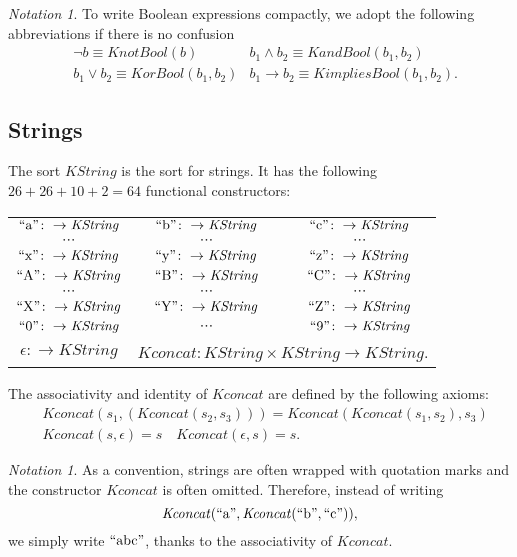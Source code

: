 \documentclass[UTF8]{article}
\newcounter{thmcounter}
\theoremstyle{plain}
\theoremstyle{definition}
\theoremstyle{remark}
\newtheorem{notation}[thmcounter]{Notation}
\newcommand{\KandBool}{\mathit{KandBool}}
\newcommand{\KorBool}{\mathit{KorBool}}
\newcommand{\KnotBool}{\mathit{KnotBool}}
\newcommand{\KimpliesBool}{\mathit{KimpliesBool}}
\newcommand{\KString}{\mathit{KString}}
\newcommand{\Kconcat}{\mathit{Kconcat}}
\newcommand{\quot}[1]{\mathrm{``#1"}}
\begin{document}
\begin{notation}
	To write Boolean expressions compactly, we adopt the following abbreviations if there is no confusion
	\begin{align*}
	&\neg b \equiv \KnotBool(b)
	&b_1 \wedge b_2 \equiv \KandBool(b_1, b_2)
	\\
	&b_1 \vee b_2 \equiv \KorBool(b_1, b_2)
	&b_1 \to b_2 \equiv \KimpliesBool(b_1, b_2).
	\end{align*}
\end{notation}

\subsection{Strings}
The sort $\KString$ is the sort for strings. It has the following $26 + 26 + 10 + 2 = 64$ functional constructors:
\begin{center}
\begin{tabular}{c c c}
	$\quot{a} \colon \to \KString$ & $\quot{b} \colon \to \KString$ & $\quot{c} \colon \to \KString$ \\
	$\cdots$ & $\cdots$ & $\cdots$ \\
	$\quot{x} \colon \to \KString$ & $\quot{y} \colon \to \KString$ & $\quot{z} \colon \to \KString$ \\
	$\quot{A} \colon \to \KString$ & $\quot{B} \colon \to \KString$ & $\quot{C} \colon \to \KString$ \\
    $\cdots$ & $\cdots$ & $\cdots$ \\
    $\quot{X} \colon \to \KString$ & $\quot{Y} \colon \to \KString$ & $\quot{Z} \colon \to \KString$ \\
    $\quot{0} \colon \to \KString$ & $\cdots$ & $\quot{9} \colon \to \KString$ \\
    $\epsilon \colon \to \KString$ & \multicolumn{2}{c}{$\Kconcat \colon \KString \times \KString \to \KString$.}
\end{tabular}
\end{center}

The associativity and identity of $\Kconcat$ are defined by the following axioms:
\begin{align*}
&\Kconcat(s_1, (\Kconcat(s_2, s_3))) = \Kconcat(\Kconcat(s_1, s_2), s_3)
\\
&\Kconcat(s, \epsilon) = s \quad \Kconcat(\epsilon, s) = s.
\end{align*}

\begin{notation}
	As a convention, strings are often wrapped with quotation marks and the constructor $\Kconcat$ is often omitted.
	Therefore, instead of writing $$\Kconcat(\quot{a}, \Kconcat(\quot{b}, \quot{c})),$$ we simply write $\quot{abc}$, thanks to the associativity of $\Kconcat$. 
\end{notation}
\end{document}
